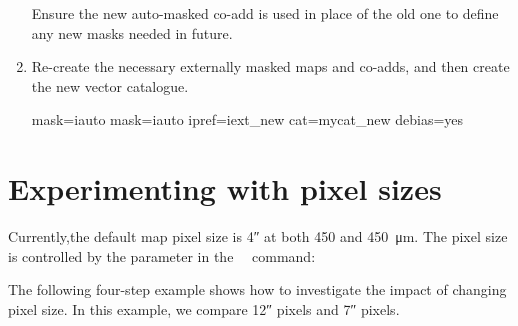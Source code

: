 \begin{enumerate}
  Ensure the new auto-masked co-add is used in place of the old one to
  define any new masks needed in future.

\begin{terminalv}
\end{terminalv}

\item Re-create the necessary externally masked maps and co-adds, and
  then create the new vector catalogue.

\begin{terminalv}
     mask=iauto
     mask=iauto ipref=iext_new cat=mycat_new debias=yes
\end{terminalv}
\end{enumerate}


\section{Experimenting with pixel sizes}

Currently,the default map pixel size is 4\si{\arcsecond} at both
450 and \SI{450}{\micro\metre}. The pixel size is controlled by the
 parameter in the \smurf\ \poltwomap\ command:

\begin{terminalv}
\end{terminalv}


The following four-step example shows how to investigate the impact of
changing pixel size.  In this example, we compare 12\si{\arcsecond}
pixels and 7\si{\arcsecond} pixels.

